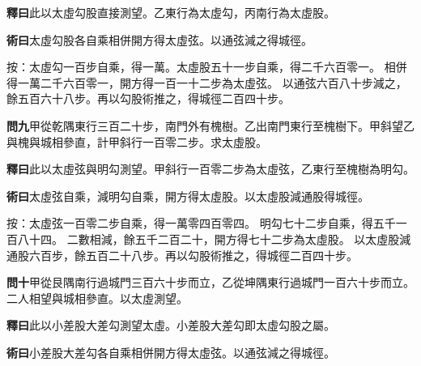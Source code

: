 \documentclass[12pt,a4paper]{article}
\begin{document}
\vspace{0.3em}

\noindent\textbf{釋曰}\quad 此以太虛勾股直接測望。乙東行為太虛勾，丙南行為太虛股。

\vspace{0.3em}

\noindent\textbf{術曰}\quad 太虛勾股各自乘相併開方得太虛弦。以通弦減之得城徑。

\vspace{0.3em}

\noindent
按：太虛勾一百步自乘，得一萬。太虛股五十一步自乘，得二千六百零一。
相併得一萬二千六百零一，開方得一百一十二步為太虛弦。
以通弦六百八十步減之，餘五百六十八步。再以勾股術推之，得城徑二百四十步。

\vspace{0.5em}

\noindent\textbf{問九}\quad 甲從乾隅東行三百二十步，南門外有槐樹。乙出南門東行至槐樹下。甲斜望乙與槐與城相參直，計甲斜行一百零二步。求太虛股。

\vspace{0.3em}

\noindent\textbf{釋曰}\quad 此以太虛弦與明勾測望。甲斜行一百零二步為太虛弦，乙東行至槐樹為明勾。

\vspace{0.3em}

\noindent\textbf{術曰}\quad 太虛弦自乘，減明勾自乘，開方得太虛股。以太虛股減通股得城徑。

\vspace{0.3em}

\noindent
按：太虛弦一百零二步自乘，得一萬零四百零四。
明勾七十二步自乘，得五千一百八十四。
二數相減，餘五千二百二十，開方得七十二步為太虛股。
以太虛股減通股六百步，餘五百二十八步。再以勾股術推之，得城徑二百四十步。

\vspace{0.5em}

\noindent\textbf{問十}\quad 甲從艮隅南行過城門三百六十步而立，乙從坤隅東行過城門一百六十步而立。二人相望與城相參直。以太虛測望。

\vspace{0.3em}

\noindent\textbf{釋曰}\quad 此以小差股大差勾測望太虛。小差股大差勾即太虛勾股之屬。

\vspace{0.3em}

\noindent\textbf{術曰}\quad 小差股大差勾各自乘相併開方得太虛弦。以通弦減之得城徑。

\vspace{0.3em}
\end{document}
